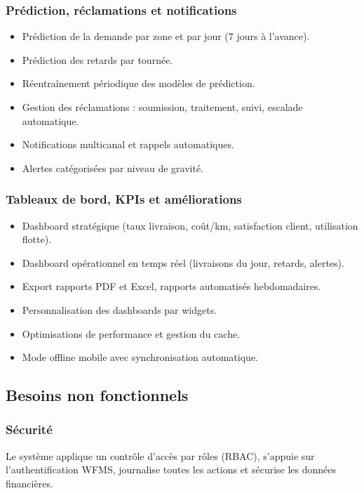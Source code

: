 \subsubsection{Prédiction, réclamations et notifications}
\begin{itemize}[leftmargin=2.5em]
    \item[$\bullet$] Prédiction de la demande par zone et par jour (7 jours à l'avance).
    \item[$\bullet$] Prédiction des retards par tournée.
    \item[$\bullet$] Réentraînement périodique des modèles de prédiction.
    \item[$\bullet$] Gestion des réclamations : soumission, traitement, suivi, escalade automatique.
    \item[$\bullet$] Notifications multicanal et rappels automatiques.
    \item[$\bullet$] Alertes catégorisées par niveau de gravité.
\end{itemize}

\subsubsection{Tableaux de bord, KPIs et améliorations}
\begin{itemize}[leftmargin=2.5em]
    \item[$\bullet$] Dashboard stratégique (taux livraison, coût/km, satisfaction client, utilisation flotte).
    \item[$\bullet$] Dashboard opérationnel en temps réel (livraisons du jour, retards, alertes).
    \item[$\bullet$] Export rapports PDF et Excel, rapports automatisés hebdomadaires.
    \item[$\bullet$] Personnalisation des dashboards par widgets.
    \item[$\bullet$] Optimisations de performance et gestion du cache.
    \item[$\bullet$] Mode offline mobile avec synchronisation automatique.
\end{itemize}

\subsection{Besoins non fonctionnels}

\subsubsection{Sécurité}
Le système applique un contrôle d'accès par rôles (RBAC), s'appuie sur l'authentification WFMS, journalise toutes les actions et sécurise les données financières.

